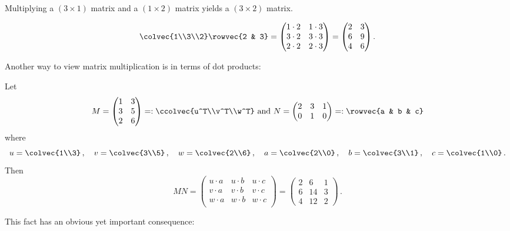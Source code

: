 

\begin{example}
Multiplying a $(3\times 1)$ matrix and a $(1\times 2)$ matrix yields a $(3\times 2)$ matrix.

\[
\colvec{1\\3\\2} \rowvec{2 & 3} = 
\begin{pmatrix}
1\cdot 2 & 1\cdot 3 \\
3\cdot 2 & 3\cdot 3 \\
2\cdot 2 & 2\cdot 3 \\
\end{pmatrix}
= \begin{pmatrix}
2 & 3 \\
6 & 9 \\
4 & 6 
\end{pmatrix} .
\]
\end{example}

Another way to view matrix multiplication is in terms of dot products:

\begin{center}
\end{center}


\begin{example}
Let $$M=\begin{pmatrix}1&3\\3&5\\2&6\end{pmatrix}=:\ccolvec{u^T\\v^T\\w^T}
\mbox{ and }
N=\begin{pmatrix}2&3&1\\0&1&0\end{pmatrix}=:\rowvec{a & b & c}$$
where
$$
u=\colvec{1\\3}\, ,\quad
v=\colvec{3\\5}\, ,\quad 
w=\colvec{2\\6}\, ,\quad
a=\colvec{2\\0}\, ,\quad
b=\colvec{3\\1}\, ,\quad 
c=\colvec{1\\0}\, .
$$
Then 
$$
MN=\left(\!\begin{array}{ccc}
u\cdot a & u\cdot b & u\cdot c\\
v\cdot a & v\cdot b & v\cdot c\\
w\cdot a & w\cdot b & w\cdot c\\ 
\end{array}\!\right)
=
\begin{pmatrix}
2&6&1\\
6&14&3\\
4&12&2
\end{pmatrix}\, .
$$
\end{example}
This fact has an obvious yet important consequence:

